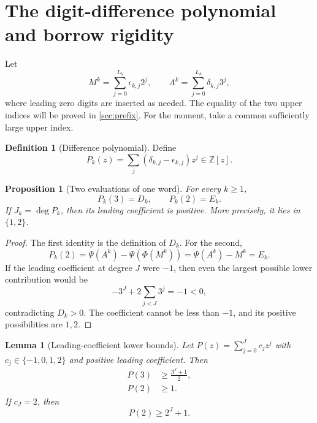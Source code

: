 \documentclass[11pt]{article}
\newtheorem{proposition}[theorem]{Proposition}
\newtheorem{lemma}[theorem]{Lemma}
\theoremstyle{definition}
\newtheorem{definition}[theorem]{Definition}
\newcommand{\Z}{\mathbb Z}
\begin{document}
\section{The digit-difference polynomial and borrow rigidity}
\label{sec:digit-polynomial}

Let
\[
 M^k=\sum_{j=0}^{L_k}\epsilon_{k,j}2^j,
 \qquad
 A^k=\sum_{j=0}^{L_k}\delta_{k,j}3^j,
\]
where leading zero digits are inserted as needed.  The equality of the two
upper indices will be proved in \cref{sec:prefix}.  For the moment, take a
common sufficiently large upper index.

\begin{definition}[Difference polynomial]\label{def:Pk}
Define
\begin{equation}\label{eq:Pk}
 P_k(z)=\sum_j(\delta_{k,j}-\epsilon_{k,j})z^j
       \in\Z[z].
\end{equation}
\end{definition}

\begin{proposition}[Two evaluations of one word]\label{prop:Pk-eval}
For every \(k\ge1\),
\begin{equation}\label{eq:Pk-evals}
  P_k(3)=D_k,
  \qquad
  P_k(2)=E_k.
\end{equation}
If \(J_k=\deg P_k\), then its leading coefficient is positive.  More
precisely, it lies in \(\{1,2\}\).
\end{proposition}

\begin{proof}
The first identity is the definition of \(D_k\).  For the second,
\[
 P_k(2)=\Psi(A^k)-\Psi(\Phi(M^k))
       =\Psi(A^k)-M^k=E_k.
\]
If the leading coefficient at degree \(J\) were \(-1\), then even the
largest possible lower contribution would be
\[
 -3^J+2\sum_{j<J}3^j=-1<0,
\]
contradicting \(D_k>0\).  The coefficient cannot be less than \(-1\), and
its positive possibilities are \(1,2\).
\end{proof}

\begin{lemma}[Leading-coefficient lower bounds]\label{lem:lead-lower}
Let \(P(z)=\sum_{j=0}^Jc_jz^j\) with
\(c_j\in\{-1,0,1,2\}\) and positive leading coefficient.  Then
\begin{align}
 P(3)&\ge\frac{3^J+1}{2},\label{eq:P3-lower}\\
 P(2)&\ge1.\label{eq:P2-lower}
\end{align}
If \(c_J=2\), then
\begin{equation}\label{eq:P2-leading2}
 P(2)\ge2^J+1.
\end{equation}
\end{lemma}
\end{document}
